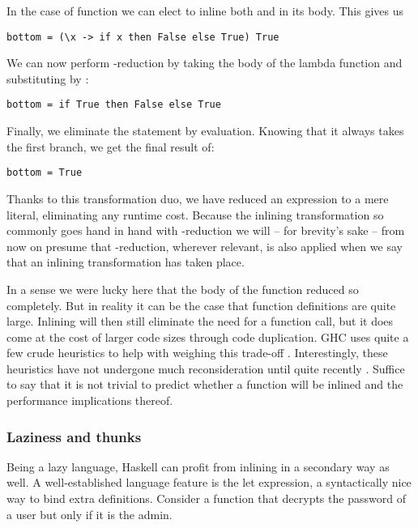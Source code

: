 In the case of  function we can elect to inline both  and 
in its body. This gives us 

\begin{listing}[H]
\begin{verbatim}
bottom = (\x -> if x then False else True) True
\end{verbatim}
\end{listing}

We can now perform \textbeta-reduction by taking the body of the lambda function
and substituting  by :

\begin{listing}[H]
\begin{verbatim}
bottom = if True then False else True
\end{verbatim}
\end{listing}

Finally, we eliminate the  statement by evaluation. Knowing that it always takes the first branch, we
get the final result of:

\begin{listing}[H]
\begin{verbatim}
bottom = True
\end{verbatim}
\end{listing}

Thanks to this transformation duo, we have reduced an expression to a mere literal, 
eliminating any runtime cost. Because the inlining transformation so commonly goes hand
in hand with \textbeta-reduction we will -- for brevity's sake -- from now on presume that \textbeta-reduction,
wherever relevant, is also applied when we say that an inlining transformation has taken place.

In a sense we were lucky here that the body of the  function reduced so completely. But in reality
it can be the case that function definitions are quite large. Inlining will then still eliminate the need for a function call,
but it does come at the cost of larger code sizes through code duplication.
GHC uses quite a few crude heuristics to help with weighing this trade-off \cite{haskell_optimisations_1997}.
Interestingly, these heuristics have not undergone much reconsideration until quite recently \cite{inling_magic_numbers}. 
Suffice to say that it is not trivial to predict whether a function will be inlined and the performance implications thereof.

\subsubsection{Laziness and thunks}
Being a lazy language, Haskell can profit from inlining in a secondary way as well. A well-established
language feature is the let expression, a syntactically nice way to bind extra definitions. Consider a function
that decrypts the password of a user but only if it is the admin.

